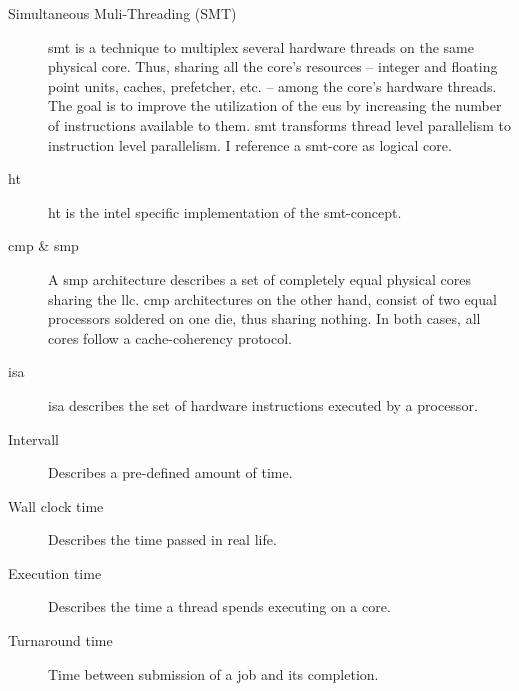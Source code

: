 \begin{description}
  \item[Simultaneous Muli-Threading (SMT)] \gls{smt} is a technique to
    multiplex several hardware threads on the same physical core.
    Thus, sharing all the core's resources -- integer and floating point units,
    caches, prefetcher, etc. -- among the core's hardware threads.
    The goal is to improve the utilization of the \gls{eu}s by increasing
    the number of instructions available to them.
    \gls{smt} transforms thread level parallelism to instruction level
    parallelism.
    I reference a \gls{smt}-core as logical core.

  \item[\Gls{ht}] \gls{ht} is the \gls{intel} specific implementation of the
    \gls{smt}-concept.

  \item[\Gls{cmp}  \& \Gls{smp}]
    A \Gls{smp} architecture describes a set of completely equal physical
    cores sharing the \gls{llc}.
    \Gls{cmp} architectures on the other hand, consist of two equal processors
    soldered on one die, thus sharing nothing.
    In both cases, all cores follow a cache-coherency protocol.

  \item[\Gls{isa}]\gls{isa} describes the set of hardware instructions executed
    by a processor.

  \item[Intervall] Describes a pre-defined amount of time.
  \item[Wall clock time] Describes the time passed in real life.
  \item[Execution time] Describes the time a thread spends executing on a
    core.
  \item[Turnaround time] Time between submission of a job and its completion.




\end{description}
